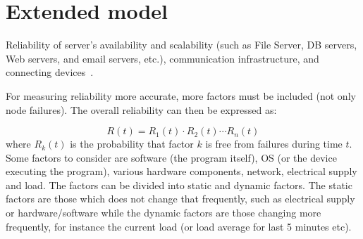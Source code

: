 \documentclass{cslthse-msc}
\begin{document}

\section{Extended model} \label{subsec:future_extended_model}
Reliability of server’s availability and scalability (such as File Server, DB servers, Web servers, and email servers, etc.), communication infrastructure, and connecting devices~\cite{surveyReliabilityDistr}.

For measuring reliability more accurate, more factors must be included (not only node failures). The overall reliability can then be expressed as:

\begin{equation} \label{eq:overall_reliability}
R(t) = R_{1}(t) \cdot R_{2}(t) \cdots R_{n}(t)
\end{equation}
where $R_{k}(t)$ is the probability that factor $k$ is free from failures during time $t$. Some factors to consider are software (the program itself), OS (or the device executing the program), various hardware components, network, electrical supply and load. The factors can be divided into static and dynamic factors. The static factors are those which does not change that frequently, such as electrical supply or hardware/software while the dynamic factors are those changing more frequently, for instance the current load (or load average for last 5 minutes etc). 
\end{document}

